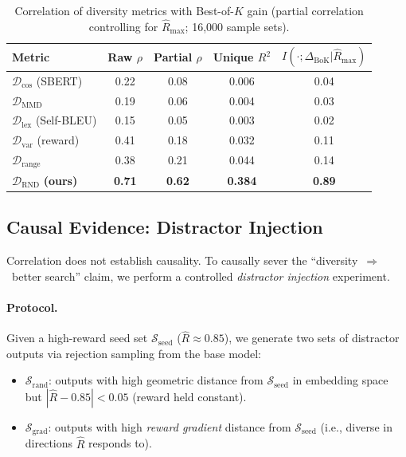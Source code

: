 \documentclass{article}
\newcommand{\cS}{\mathcal{S}}
\newcommand{\Rhat}{\hat{R}}
\newcommand{\Dcos}{\mathcal{D}_{\mathrm{cos}}}
\newcommand{\Dlex}{\mathcal{D}_{\mathrm{lex}}}
\newcommand{\Dvar}{\mathcal{D}_{\mathrm{var}}}
\newcommand{\DRND}{\mathcal{D}_{\mathrm{RND}}}
\newcommand{\DeltaBoK}{\Delta_{\mathrm{BoK}}}
\begin{document}
\begin{table}[t]
\centering
\caption{Correlation of diversity metrics with Best-of-$K$ gain
(partial correlation controlling for $\Rhat_{\max}$; 16,000 sample sets).}
\label{tab:correlation}
\small
\begin{tabular}{lcccc}
\toprule
\textbf{Metric} & \textbf{Raw $\rho$} & \textbf{Partial $\rho$} & \textbf{Unique $R^2$} & \textbf{$I(\cdot;\DeltaBoK|\Rhat_{\max})$} \\
\midrule
$\Dcos$ (SBERT)    & 0.22 & 0.08 & 0.006 & 0.04 \\
$\mathcal{D}_{\mathrm{MMD}}$ & 0.19 & 0.06 & 0.004 & 0.03 \\
$\Dlex$ (Self-BLEU)& 0.15 & 0.05 & 0.003 & 0.02 \\
$\Dvar$ (reward)   & 0.41 & 0.18 & 0.032 & 0.11 \\
$\mathcal{D}_{\mathrm{range}}$ & 0.38 & 0.21 & 0.044 & 0.14 \\
\midrule
$\DRND$ \textbf{(ours)} & \textbf{0.71} & \textbf{0.62} & \textbf{0.384} & \textbf{0.89} \\
\bottomrule
\end{tabular}
\end{table}

\subsection{Causal Evidence: Distractor Injection}
\label{sec:distractor}

Correlation does not establish causality.  To causally sever the
``diversity~$\Rightarrow$~better search'' claim, we perform a controlled
\emph{distractor injection} experiment.

\paragraph{Protocol.}
Given a high-reward seed set $\cS_{\mathrm{seed}}$ ($\Rhat \approx 0.85$), we
generate two sets of distractor outputs via rejection sampling from the base model:
\begin{itemize}
  \item $\cS_{\mathrm{rand}}$: outputs with high geometric distance from
    $\cS_{\mathrm{seed}}$ in embedding space but $|\Rhat - 0.85| < 0.05$
    (reward held constant).
  \item $\cS_{\mathrm{grad}}$: outputs with high \emph{reward gradient} distance
    from $\cS_{\mathrm{seed}}$ (i.e., diverse in directions $\Rhat$ responds to).
\end{itemize}
\end{document}
